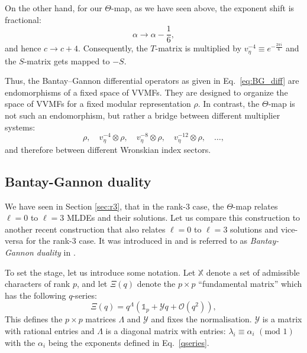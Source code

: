 \documentclass[11pt]{article}
\newcommand\be{\begin{equation}}
\newcommand\ee{\end{equation}}
\begin{document}
On the other hand, for our $\Theta$-map, as we have seen above, the exponent shift is fractional:
\be
  \alpha\to \alpha-\frac16,
\ee
and hence $c\to c+4$. 
Consequently, the \(T\)-matrix is multiplied by \(v_\eta^{-4}\equiv e^{-\frac{2\pi i}{6}}\) and the \(S\)-matrix gets mapped to \(-S\).

Thus, the Bantay--Gannon differential operators as given in Eq.~\eqref{eq:BG_diff} are endomorphisms of a fixed space of VVMFs. They are designed to organize the space of VVMFs for a fixed modular representation \(\rho\). In contrast, the \(\Theta\)-map is not such an endomorphism, but rather a bridge between different multiplier systems:
\be
  \rho,\quad
  v_\eta^{-4}\otimes\rho,\quad
  v_\eta^{-8}\otimes\rho,\quad
  v_\eta^{-12}\otimes\rho, \quad \ldots ,
\ee
and therefore between different Wronskian index sectors.

\subsection{Bantay-Gannon duality}
\label{app:bg_duality}

We have seen in Section \ref{sec:r3}, that in the rank-3 case, the $\Theta$-map relates $\ell=0$ to $\ell=3$ MLDEs and their solutions. Let us compare this construction to another recent construction that also relates $\ell=0$ to $\ell=3$ solutions and vice-versa for the rank-3 case. It was introduced in \cite{Bantay:2007zz} and is referred to as {\it Bantay-Gannon duality} in \cite{Govindarajan:2025jlq}.

To set the stage, let us introduce some notation. Let $\mathbb{X}$ denote a set of admissible characters of rank $p$, and let $\Xi(q)$ denote the $p\times p$ ``fundamental matrix'' \cite{Bantay:2007zz, Gannon:2013jua} which has the following $q$-series: 
\be
\Xi(q)=q^\Lambda\left({\mathds 1}_p + \mathcal{Y}q+\mathcal{O}(q^2)\right),
\ee
This defines the $p\times p$ matrices $\Lambda$ and $\mathcal{Y}$ and fixes the normalisation. $\mathcal{Y}$ is a matrix with rational entries and $\Lambda$ is a diagonal matrix with entries: $\lambda_i\equiv\alpha_i\,\,(\text{mod }1)$ with the $\alpha_i$ being the exponents defined in Eq.~\eqref{qseries}.
\end{document}
